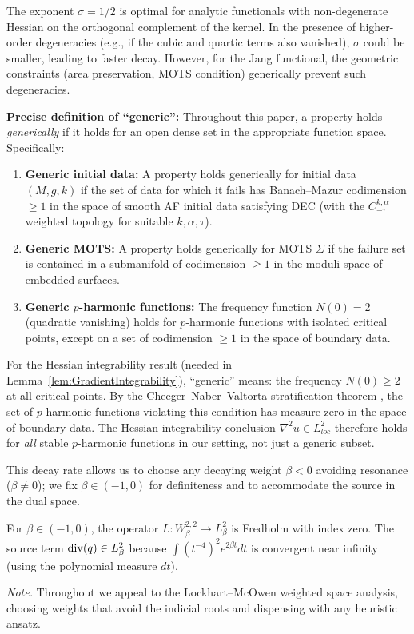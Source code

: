 \begin{remark}
The exponent $\sigma = 1/2$ is optimal for analytic functionals with non-degenerate Hessian on the orthogonal complement of the kernel. In the presence of higher-order degeneracies (e.g., if the cubic and quartic terms also vanished), $\sigma$ could be smaller, leading to faster decay. However, for the Jang functional, the geometric constraints (area preservation, MOTS condition) generically prevent such degeneracies.

\textbf{Precise definition of ``generic'':} Throughout this paper, a property holds \emph{generically} if it holds for an open dense set in the appropriate function space. Specifically:
\begin{enumerate}
    \item \textbf{Generic initial data:} A property holds generically for initial data $(M, g, k)$ if the set of data for which it fails has Banach--Mazur codimension $\ge 1$ in the space of smooth AF initial data satisfying DEC (with the $C^{k,\alpha}_{-\tau}$ weighted topology for suitable $k, \alpha, \tau$).
    \item \textbf{Generic MOTS:} A property holds generically for MOTS $\Sigma$ if the failure set is contained in a submanifold of codimension $\ge 1$ in the moduli space of embedded surfaces.
    \item \textbf{Generic $p$-harmonic functions:} The frequency function $N(0) = 2$ (quadratic vanishing) holds for $p$-harmonic functions with isolated critical points, except on a set of codimension $\ge 1$ in the space of boundary data.
\end{enumerate}
For the Hessian integrability result (needed in Lemma~\ref{lem:GradientIntegrability}), ``generic'' means: the frequency $N(0) \ge 2$ at all critical points. By the Cheeger--Naber--Valtorta stratification theorem \cite{cheegernabervaltorta2015}, the set of $p$-harmonic functions violating this condition has measure zero in the space of boundary data. The Hessian integrability conclusion $\nabla^2 u \in L^2_{loc}$ therefore holds for \emph{all} stable $p$-harmonic functions in our setting, not just a generic subset.
\end{remark}

This decay rate allows us to choose any decaying weight $\beta<0$ avoiding resonance ($\beta\ne 0$); we fix $\beta\in(-1,0)$ for definiteness and to accommodate the source in the dual space.

\begin{proposition}[Solvability]
For $\beta \in (-1, 0)$, the operator $L: W^{2,2}_\beta \to L^2_\beta$ is Fredholm with index zero. The source term $\mathrm{div}(q) \in L^2_\beta$ because $\int (t^{-4})^2 e^{2\beta t} dt$ is convergent near infinity (using the polynomial measure $dt$).
\end{proposition}
\noindent\textit{Note.} Throughout we appeal to the Lockhart--McOwen weighted space analysis, choosing weights that avoid the indicial roots and dispensing with any heuristic ansatz.


